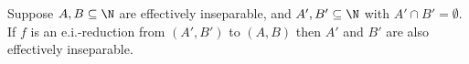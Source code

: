 \documentclass[runningheads]{amsart}
\begin{document}
\begin{proposition}\label{prop-reduction}
Suppose $A,B \subseteq \N$ are effectively inseparable, and 
 $A',B' \subseteq \N$ with $A' \cap B' = \emptyset$.  
If $f$ is an e.i.-reduction from $(A',B')$ to $(A,B)$ 
then $A'$ and $B'$ are also effectively inseparable.
\end{proposition}
\end{document}
